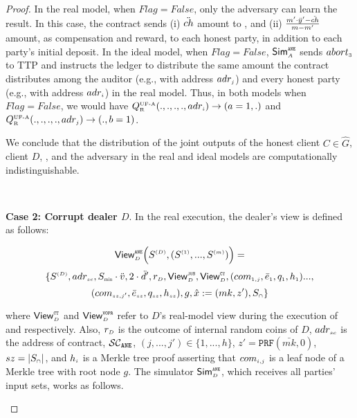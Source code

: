 \begin{proof}
In the real model, when $Flag=False$, only the adversary can learn the result. In this case, the contract sends (i) $\ddot{ch}$ amount to \aud, and (ii) $\frac{m'\cdot \ddot{y}'-\ddot{ch}}{m-m'}$ amount, as compensation and reward, to each honest party, in addition to each party's initial deposit. In the ideal model,  when $Flag=False$, $\mathsf{Sim}^{\scriptscriptstyle \mathtt{ANE}}_{\scriptscriptstyle A}$ sends $abort_{\scriptscriptstyle 3}$ to TTP and instructs the ledger to distribute the same amount the contract distributes among the auditor (e.g., with address $adr_{\scriptscriptstyle j}$) and every honest party (e.g., with address $adr_{\scriptscriptstyle i}$) in the real model.  Thus, in both models when $Flag=False$, we would have $Q^{\scriptscriptstyle \text{UF-A}}_{\scriptscriptstyle \text{R}}(., ., ., ., adr_{\scriptscriptstyle i})\rightarrow (a=1, .)$ and  $Q^{\scriptscriptstyle \text{UF-A}}_{\scriptscriptstyle \text{R}}(., ., ., ., adr_{\scriptscriptstyle j})\rightarrow (., b=1)$. 

We conclude that the distribution of the joint outputs of the honest client $C\in \hat G$, client $D$, \aud, and the adversary in the real and ideal models are computationally indistinguishable.



\



\noindent\textbf{Case 2: Corrupt dealer $D$}.  In the real execution, the dealer's view is defined as follows: 


$$ \mathsf{View}_{\scriptscriptstyle D}^{\scriptscriptstyle \mathtt{ANE}} \Big(S^{\scriptscriptstyle (D)}, (S^{\scriptscriptstyle (1)},..., S^{\scriptscriptstyle (m)})\Big)=$$ $$ \{S^{\st (D)}, adr_{\st sc}, S_{\minn}\cdot \vc, 2\cdot \dc', 
%
%
 r_{\st D},  \mathsf{View}^{\st \fpsi}_{\st D}, \mathsf{View}^{\st \ct}_{\st D}, (com_{\st 1,j}, \bar{e}_{\st 1}, q_{\st 1}, h_{\st 1})...,$$ $$ (com_{\scriptscriptstyle sz, j'}, \bar{e}_{\scriptscriptstyle sz}, q_{\scriptscriptstyle {sz}}, h_{\scriptscriptstyle sz}), g, \hat{x}:=({mk}, z'), 
  S_{\scriptscriptstyle \cap}\}$$

where  $\mathsf{View}^{\scriptscriptstyle \mathtt{CT}}_{\scriptscriptstyle D}$ and $\mathsf{View}^{\scriptscriptstyle \mathtt{VOPR}}_{\scriptscriptstyle D}$ refer to $D$'s real-model view during the execution of \ct and \vopr respectively. Also, $r_{\scriptscriptstyle D}$ is the outcome of internal random coins of $D$, $adr_{\scriptscriptstyle sc}$ is the address of contract, $\mathcal{SC}_{\mathtt{ANE}}$, $(j, ...,j')\in \{1,..., h\}$, $z'=\mathtt{PRF}(\bar{mk}, 0)$, $sz=|S_{\scriptscriptstyle \cap}|$, and $h_{\scriptscriptstyle i}$ is a Merkle tree proof asserting that $com_{\scriptscriptstyle i,j}$ is a leaf node of a Merkle tree with root node $g$. The simulator $\mathsf{Sim}^{\scriptscriptstyle \mathtt{ANE}}_{\scriptscriptstyle D}$, which receives all parties' input sets, works as follows. 

\begin{enumerate}


\end{enumerate}
\end{proof}
